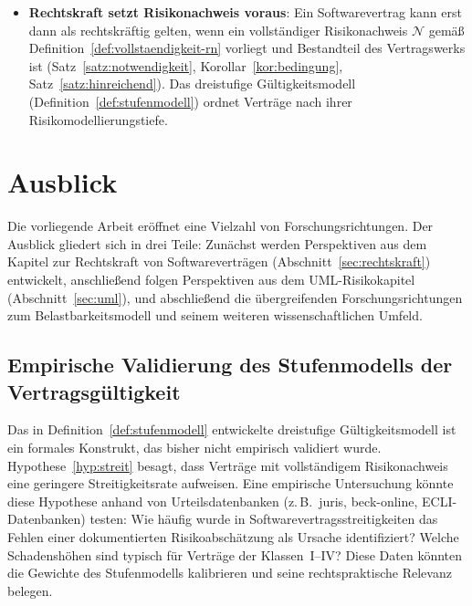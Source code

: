 ﻿\documentclass[a4paper,12pt]{article}
\theoremstyle{definition}
\begin{document}
\begin{itemize}
    \item \textbf{Rechtskraft setzt Risikonachweis voraus}: Ein Softwarevertrag
          kann erst dann als rechtskr\"aftig gelten, wenn ein vollst\"andiger
          Risikonachweis $\mathcal{N}$ gem\"a\ss{} Definition~\ref{def:vollstaendigkeit-rn}
          vorliegt und Bestandteil des Vertragswerks ist
          (Satz~\ref{satz:notwendigkeit}, Korollar~\ref{kor:bedingung},
          Satz~\ref{satz:hinreichend}). Das dreistufige G\"ultigkeitsmodell
          (Definition~\ref{def:stufenmodell}) ordnet Vertr\"age nach ihrer
          Risikomodellierungstiefe.
\end{itemize}

\section{Ausblick}

Die vorliegende Arbeit er\"offnet eine Vielzahl von Forschungsrichtungen. Der Ausblick
gliedert sich in drei Teile: Zun\"achst werden Perspektiven aus dem Kapitel zur
Rechtskraft von Softwarevertr\"agen (Abschnitt~\ref{sec:rechtskraft}) entwickelt,
anschlie\ss{}end folgen Perspektiven aus dem UML-Risikokapitel
(Abschnitt~\ref{sec:uml}), und abschlie\ss{}end die \"ubergreifenden
Forschungsrichtungen zum Belastbarkeitsmodell und seinem weiteren wissenschaftlichen
Umfeld.

\subsection{Empirische Validierung des Stufenmodells der Vertragsg\"ultigkeit}

Das in Definition~\ref{def:stufenmodell} entwickelte dreistufige G\"ultigkeitsmodell
ist ein formales Konstrukt, das bisher nicht empirisch validiert wurde.
Hypothese~\ref{hyp:streit} besagt, dass Vertr\"age mit vollst\"andigem Risikonachweis
eine geringere Streitigkeitsrate aufweisen. Eine empirische Untersuchung k\"onnte
diese Hypothese anhand von Urteilsdatenbanken (z.\,B.\ juris, beck-online,
ECLI-Datenbanken) testen: Wie h\"aufig wurde in Softwarevertragsstreitigkeiten das
Fehlen einer dokumentierten Risikoabsch\"atzung als Ursache identifiziert? Welche
Schadensh\"ohen sind typisch f\"ur Vertr\"age der Klassen~I--IV? Diese Daten k\"onnten
die Gewichte des Stufenmodells kalibrieren und seine rechtspraktische Relevanz belegen.
\end{document}
